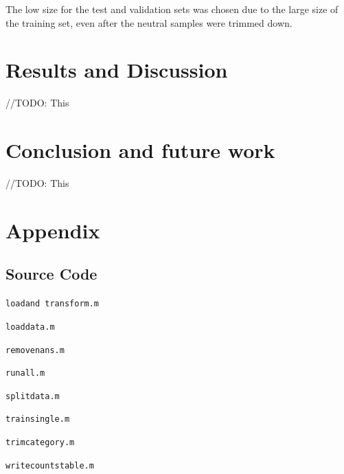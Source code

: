 \documentclass[journal]{IEEEtran}
\newcommand{\codelisting}[2]{
    \texttt{#1}
    
}
\begin{document}
The low size for the test and validation sets was chosen due to the large size of the training set,
even after the neutral samples were trimmed down.

\section{Results and Discussion}
//TODO: This

\section{Conclusion and future work}
//TODO: This


\section*{Appendix}
\subsection*{Source Code}

\codelisting{load\textunderscore and \textunderscore transform.m}{src/load_and_transform.m}
\codelisting{load\textunderscore data.m}{src/load_data.m}
\codelisting{remove\textunderscore nans.m}{src/remove_nans.m}
\codelisting{run\textunderscore all.m}{src/run_all.m}
\codelisting{split\textunderscore data.m}{src/split_data.m}
\codelisting{train\textunderscore single.m}{src/train_single.m}
\codelisting{trim\textunderscore category.m}{src/trim_category.m}
\codelisting{write\textunderscore counts\textunderscore table.m}{src/write_counts_table.m}




\end{document}
